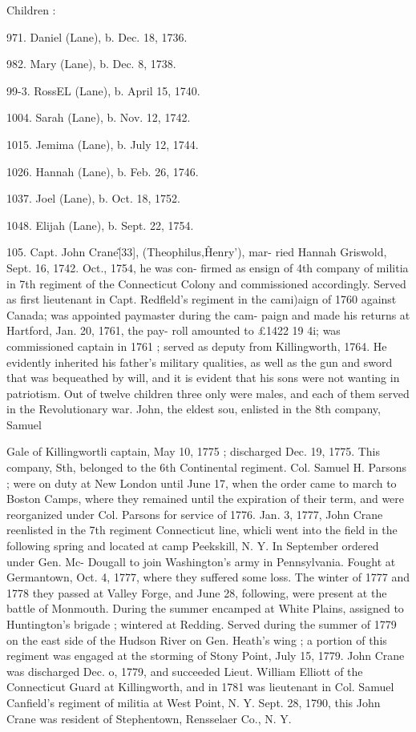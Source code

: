 Children : 

971. Daniel (Lane), b. Dec. 18, 1736. 

982. Mary (Lane), b. Dec. 8, 1738. 

99-3. RossEL (Lane), b. April 15, 1740. 

1004. Sarah (Lane), b. Nov. 12, 1742. 

1015. Jemima (Lane), b. July 12, 1744. 

1026. Hannah (Lane), b. Feb. 26, 1746. 

1037. Joel (Lane), b. Oct. 18, 1752. 

1048. Elijah (Lane), b. Sept. 22, 1754. 

105. Capt. John Crane\^ [33], (Theophilus,\^ Henry'), mar- 
ried Hannah Griswold, Sept. 16, 1742. Oct., 1754, he was con- 
firmed as ensign of 4th company of militia in 7th regiment of the 
Connecticut Colony and commissioned accordingly. Served as 
first lieutenant in Capt. Redfleld's regiment in the cami)aign of 
1760 against Canada; was appointed paymaster during the cam- 
paign and made his returns at Hartford, Jan. 20, 1761, the pay- 
roll amounted to £1422  19  4i; was commissioned captain in 
1761 ; served as deputy from Killingworth, 1764. He evidently 
inherited his father's military qualities, as well as the gun and 
sword that was bequeathed by will, and it is evident that his sons 
were not wanting in patriotism. Out of twelve children three 
only were males, and each of them served in the Revolutionary 
war. John, the eldest sou, enlisted in the 8th company, Samuel 




Gale of Killingwortli captain, May 10, 1775 ; discharged Dec. 
19, 1775. This company, Sth, belonged to the 6th Continental 
regiment. Col. Samuel H. Parsons ; were on duty at New London 
until June 17, when the order came to march to Boston Camps, 
where they remained until the expiration of their term, and were 
reorganized under Col. Parsons for service of 1776. Jan. 3, 
1777, John Crane reenlisted in the 7th regiment Connecticut line, 
whicli went into the field in the following spring and located at 
camp Peekskill, N. Y. In September ordered under Gen. Mc- 
Dougall to join Washington's army in Pennsylvania. Fought at 
Germantown, Oct. 4, 1777, where they suffered some loss. The 
winter of 1777 and 1778 they passed at Valley Forge, and June 
28, following, were present at the battle of Monmouth. During 
the summer encamped at White Plains, assigned to Huntington's 
brigade ; wintered at Redding. Served during the summer of 
1779 on the east side of the Hudson River on Gen. Heath's wing ; 
a portion of this regiment was engaged at the storming of Stony 
Point, July 15, 1779. John Crane was discharged Dec. o, 1779, 
and succeeded Lieut. William Elliott of the Connecticut Guard at 
Killingworth, and in 1781 was lieutenant in Col. Samuel Canfield's 
regiment of militia at West Point, N. Y. Sept. 28, 1790, this 
John Crane was resident of Stephentown, Rensselaer Co., N. Y. 


